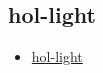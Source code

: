 \subsection{hol-light}
\label{sec:hol-light}
\begin{itemize}
\item \href{http://code.google.com/p/hol-light/}{hol-light} 
\end{itemize}

